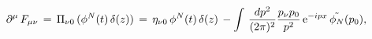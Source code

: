 \begin{equation}
\label{feq}
\partial^{\mu}\, F_{\mu\nu} \, = \, \Pi_{\nu 0}\, (\phi^N(t)\, \delta
 (z)) \, = \, \eta_{\nu 0} \, \phi^N(t) \, \delta(z)\, -
 \int \, {dp^2 \over (2\pi)^2} {p_{\nu}p_0 \over p^2} \, {\rm
 e}^{-ipx} \, \tilde{\phi_{N}}(p_0),
\end{equation}

